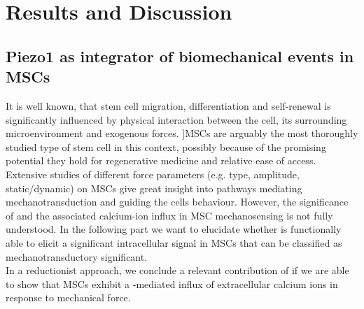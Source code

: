 \chapter{Results and Discussion}

\section{Piezo1 as integrator of biomechanical events in MSCs}
\label{sec:piezo1-as-integrator-of-biomechanical-events-in-mscs}

It is well known, that stem cell migration, differentiation and self-renewal is significantly influenced by physical interaction between the cell, its surrounding microenvironment and exogenous forces. \cite{Eyckmans2011, Lee2011}]MSCs are arguably the most thoroughly studied type of stem cell in this context, possibly because of the promising potential they hold for regenerative medicine and relative ease of access. Extensive studies of different force parameters (e.g. type, amplitude, static/dynamic) on MSCs give great insight into pathways mediating mechanotransduction and guiding the cells behaviour. However, the significance of \Piezo{} and the associated calcium-ion influx in MSC mechanosensing is not fully understood. In the following part we want to elucidate whether \Piezo{} is functionally able to elicit a significant intracellular signal in MSCs that can be classified as mechanotransductory significant.\\
In a reductionist approach, we conclude a relevant contribution of \Piezo{} if we are able to show that MSCs exhibit a \Piezo{}-mediated influx of extracellular calcium ions in response to mechanical force.\\

